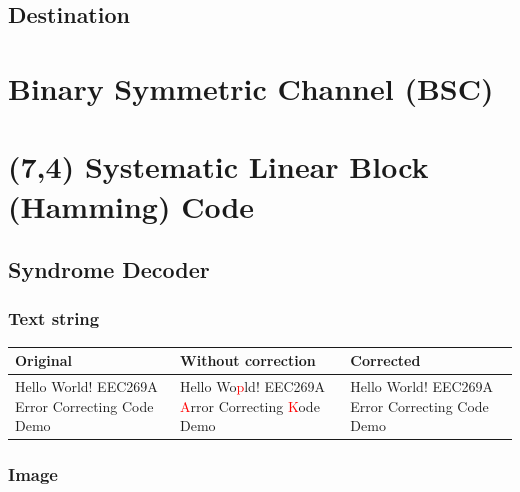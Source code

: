 \documentclass{article}
\begin{document}
\subsection{Destination}






\section{Binary Symmetric Channel (BSC)}










\section{(7,4) Systematic Linear Block (Hamming) Code}
\subsection{Syndrome Decoder}
\subsubsection{Text string}

\begin{center}
    \renewcommand{\arraystretch}{1.5}
    \begin{tabulary}{\textwidth}{ |L|L|L| } 
    \hline
    \textbf{Original} & \textbf{Without correction} & \textbf{Corrected} \\
    \hline
    Hello World! EEC269A Error Correcting Code Demo & Hello Wo\textcolor{red}{p}ld! EEC269A \textcolor{red}{A}rror Correcting \textcolor{red}{K}ode Demo & Hello World! EEC269A Error Correcting Code Demo \\
    \hline
    \end{tabulary}
\end{center}



\subsubsection{Image}
\end{document}
